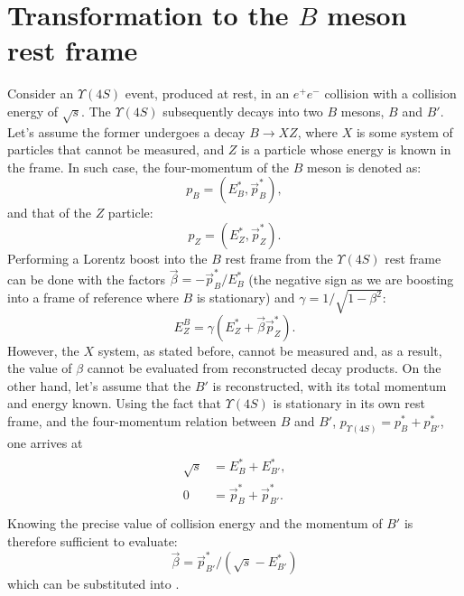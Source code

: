\chapter{Transformation to the \texorpdfstring{$B$}{B} meson rest frame} \label{sec:appendix_boosting_to_b_frame}

Consider an $\Upsilon(4S)$ event, produced at rest, in an $e^+e^-$ collision with a collision energy of $\sqrt{s}$.
The $\Upsilon(4S)$ subsequently decays into two $B$ mesons, $B$ and $B'$.
Let's assume the former undergoes a decay $B\to X Z$, where $X$ is some system of particles that cannot be measured, and $Z$ is a particle whose energy is known in the \FourS frame.
In such case, the four-momentum of the $B$ meson is denoted as:
\begin{equation}
	p_{B} = (E_B^*,\vec{p}_{B}^*),
\end{equation}
and that of the $Z$ particle:
\begin{equation}
	p_{Z} = (E_{Z}^*,\vec{p}_{Z}^*).
\end{equation}
Performing a Lorentz boost into the $B$ rest frame from the $\Upsilon(4S)$ rest frame can be done
with the factors $\vec{\beta}=-\vec{p}_{B}^*/E_{B}^*$ (the negative sign as we are boosting into a frame of reference where $B$ is stationary)
and $\gamma = 1/\sqrt{1-\beta^2}$:
\begin{equation}\label{eq:egamma}
	E_{Z}^B = \gamma(E_{Z}^* + \vec{\beta}\vec{p}_{Z}^*). 
\end{equation}
However, the $X$ system, as stated before, cannot be measured and, as a result, the value of $\beta$ cannot be evaluated from reconstructed decay products.
On the other hand, let's assume that the $B'$ is reconstructed, with its total momentum and energy known.
Using the fact that $\Upsilon(4S)$ is stationary in its own rest frame, and the four-momentum relation between $B$ and $B'$,
$p_{\Upsilon(4S)}=p_B^*+p^*_{B'}$, one arrives at
\begin{align}
	\begin{split}
		\sqrt{s} &= E^*_{B}+E^*_{B'},\\
		0 &= \vec{p}_B^* + \vec{p}^*_{B'}.\\
	\end{split}
\end{align}
Knowing the precise value of collision energy and the momentum of $B'$ is therefore sufficient to evaluate:
\begin{equation}
	\vec{\beta}= \vec{p}^*_{B'}/(\sqrt{s}-E^*_{B'})
\end{equation}
which can be substituted into .

